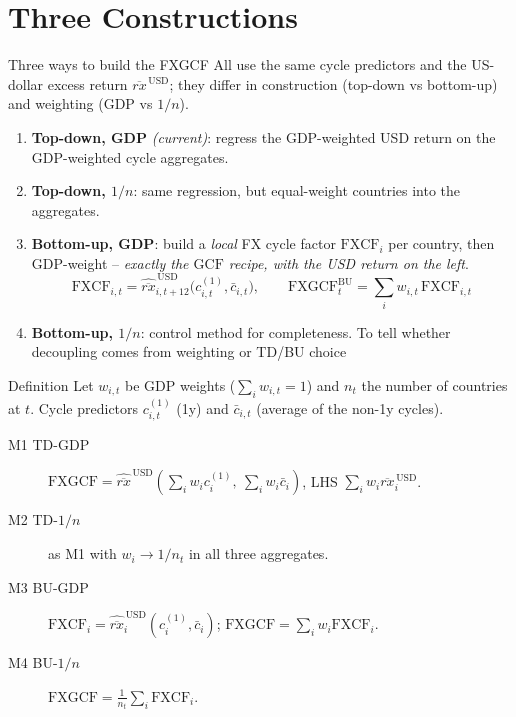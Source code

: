 \documentclass[10pt]{beamer}
\newcommand{\FXCF}{\mathrm{FXCF}}
\newcommand{\GCF}{\mathrm{GCF}}
\newcommand{\FXGCF}{\mathrm{FXGCF}}
\newcommand{\rxbar}{\overline{rx}}
\newcommand{\cyc}{c}
\newcommand{\cycbar}{\bar{c}}
\begin{document}
\section{Three Constructions}

\begin{frame}{Three ways to build the FXGCF}
  All use the same cycle predictors and the US-dollar excess return
  $\rxbar^{\,\mathrm{USD}}$; they differ in \alert{construction} (top-down vs
  bottom-up) and \alert{weighting} (GDP vs $1/n$).
  \vspace{0.5ex}
  \begin{enumerate}
    \item[\textbf{M1}] \textbf{Top-down, GDP} \emph{(current)}: regress the
      GDP-weighted USD return on the GDP-weighted cycle aggregates.
    \item[\textbf{M2}] \textbf{Top-down, $1/n$}: same regression, but
      equal-weight countries into the aggregates.
    \item[\textbf{M3}] \textbf{Bottom-up, GDP}: build a \emph{local} FX cycle
      factor $\FXCF_{i}$ per country, then GDP-weight --
      \emph{exactly the $\GCF$ recipe, with the USD return on the left}.
  \[
    \FXCF_{i,t}=\widehat{\rxbar}^{\,\mathrm{USD}}_{i,t+12}
      \bigl(\cyc^{(1)}_{i,t},\cycbar_{i,t}\bigr),
    \qquad
    \FXGCF^{\mathrm{BU}}_{t}=\sum_i w_{i,t}\,\FXCF_{i,t}
  \]
    \item[\alert{M4}] \textbf{Bottom-up, $1/n$}: control method for completeness. To tell whether decoupling comes from weighting or TD/BU choice
  \end{enumerate}

  \vspace{-0.5ex}
\end{frame}

\begin{frame}{Definition}
      Let $w_{i,t}$ be GDP weights ($\sum_i w_{i,t}=1$) and $n_t$ the number of
  countries at $t$. Cycle predictors $\cyc^{(1)}_{i,t}$ (1y) and
  $\cycbar_{i,t}$ (average of the non-1y cycles).
  \begin{description}
    \item[M1 TD-GDP] $\FXGCF=\widehat{\rxbar}^{\,\mathrm{USD}}\!\left(\sum_i w_i\cyc^{(1)}_i,\ \sum_i w_i\cycbar_i\right)$, LHS $\sum_i w_i\rxbar^{\,\mathrm{USD}}_i$.
    \item[M2 TD-$1/n$] as M1 with $w_i\!\to\!1/n_t$ in all three aggregates.
    \item[M3 BU-GDP] $\FXCF_i=\widehat{\rxbar}^{\,\mathrm{USD}}_i(\cyc^{(1)}_i,\cycbar_i)$; $\FXGCF=\sum_i w_i\FXCF_i$.
    \item[M4 BU-$1/n$] $\FXGCF=\frac{1}{n_t}\sum_i\FXCF_i$.
  \end{description}
\end{frame}
\end{document}
